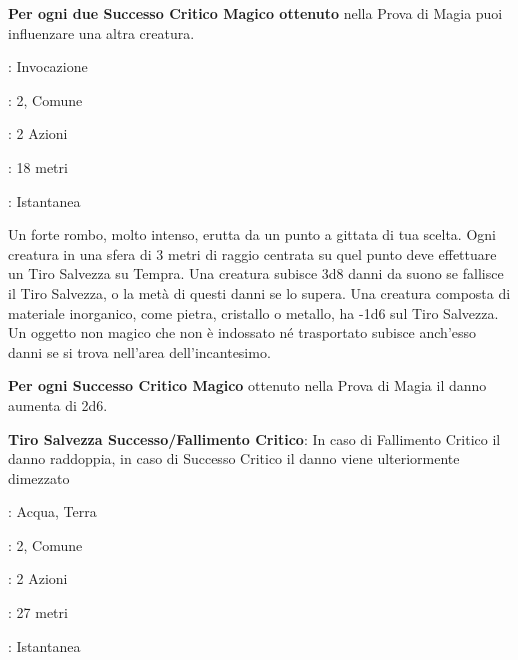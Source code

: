 \begin{multicols}{2}
\textbf{Per ogni due Successo Critico Magico ottenuto} nella Prova di Magia puoi influenzare una altra creatura.

\noindent\colorbox{OBSSgold!10}{
\begin{minipage}{0.95\linewidth}
\begin{description}[noitemsep, topsep=0pt, parsep=0pt, partopsep=0pt, leftmargin=0cm, labelwidth=1.3cm]
	\item[\textbf{Lista}]: Invocazione
	\item[\textbf{Livello}]: 2, Comune
	\item[\textbf{Lancio}]: 2 Azioni
	\item[\textbf{Gittata}]: 18 metri
	\item[\textbf{Durata}]: Istantanea
\end{description}
\end{minipage}}\smallskip

Un forte rombo, molto intenso, erutta da un punto a gittata di tua scelta. Ogni creatura in una sfera di 3 metri di raggio centrata su quel punto deve effettuare un Tiro Salvezza su Tempra. Una creatura subisce 3d8 danni da suono se fallisce il Tiro Salvezza, o la metà di questi danni se lo supera. Una creatura composta di materiale inorganico, come pietra, cristallo o metallo, ha -1d6 sul Tiro Salvezza. Un oggetto non magico che non è indossato né trasportato subisce anch'esso danni se si trova nell'area dell'incantesimo.

\textbf{Per ogni Successo Critico Magico} ottenuto nella Prova di Magia il danno aumenta di 2d6.

\textbf{Tiro Salvezza Successo/Fallimento Critico}: In caso di Fallimento Critico il danno raddoppia, in caso di Successo Critico il danno viene ulteriormente dimezzato

\noindent\colorbox{OBSSgold!10}{
\begin{minipage}{0.95\linewidth}
\begin{description}[noitemsep, topsep=0pt, parsep=0pt, partopsep=0pt, leftmargin=0cm, labelwidth=1.3cm]
	\item[\textbf{Lista}]: Acqua, Terra
	\item[\textbf{Livello}]: 2, Comune
	\item[\textbf{Lancio}]: 2 Azioni
	\item[\textbf{Gittata}]: 27 metri
	\item[\textbf{Durata}]: Istantanea
\end{description}
\end{minipage}}\smallskip


\end{multicols}
